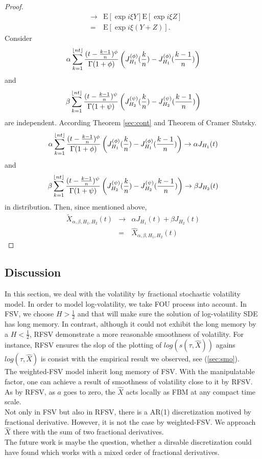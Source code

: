 \documentclass[a4paper, twoside, 11pt]{article}
\theoremstyle{definition}
\DeclarePairedDelimiter\floor{\lfloor}{\rfloor}
\newcommand{\brkt}[1]{\left({#1} \right)}
\begin{document}
\begin{proof}
\begin{eqnarray*}
  &\rightarrow& \mathrm{E}[\exp{i\xi Y}] \mathrm{E}[\exp{i\xi Z}]\\
  &=& \mathrm{E}[\exp{i\xi (Y+Z)}].
\end{eqnarray*}
Consider 
$$
\alpha\sum_{k=1}^{\floor{nt}} \frac{(t - \frac{k-1}{n})^\phi}{\Gamma(1+\phi)} \brkt{J_{H_1}^{(\phi)}(\frac{k}{n}) - J_{H_1}^{(\phi)}(\frac{k-1}{n})}$$
and 
$$\beta\sum_{k=1}^{\floor{nt}} \frac{(t - \frac{k-1}{n})^\psi}{\Gamma(1+\psi)} \brkt{J_{H_2}^{(\psi)}(\frac{k}{n}) - J_{H_2}^{(\psi)}(\frac{k-1}{n})}
$$
are independent. According Theorem \ref{sec:cont} and Theorem of Cramer Slutsky. 
$$
\alpha\sum_{k=1}^{\floor{nt}} \frac{(t - \frac{k-1}{n})^\phi}{\Gamma(1+\phi)} \brkt{J_{H_1}^{(\phi)}(\frac{k}{n}) - J_{H_1}^{(\phi)}(\frac{k-1}{n})} \rightarrow \alpha J_{H_1}(t)
$$ and
$$
\beta\sum_{k=1}^{\floor{nt}} \frac{(t - \frac{k-1}{n})^\psi}{\Gamma(1+\psi)} \brkt{J_{H_2}^{(\psi)}(\frac{k}{n}) - J_{H_2}^{(\psi)}(\frac{k-1}{n})} \rightarrow \beta J_{H_2}(t)
$$ in distribution.
Then, since mentioned above,
\begin{eqnarray*}
  \tilde{X}_{\alpha,\beta,H_1,H_2}(t) &\rightarrow& \alpha J_{H_1}(t) + \beta J_{H_2}(t)\\
  &=& \hat{X}_{\alpha,\beta,H_1,H_2}(t)
\end{eqnarray*}
	\end{proof}
	\subsection{Discussion}
	In this section, we deal with the volatility by fractional stochastic volatility model. In order to model log-volatility, we take FOU process into account. In FSV, we choose $H > \frac{1}{2}$ and that will make sure the solution of log-volatility SDE has long memory. In contrast, although it could not exhibit the long memory by a $H < \frac{1}{2}$, RFSV demonstrate a more reasonable smoothness of volatility. For instance, RFSV ensures  the slop of the plotting of $log(s(\tau, \hat{X}))$ agains $log(\tau, \hat{X})$ is consist with the empirical result we observed, see (\ref{sec:smo}).\\
	The weighted-FSV model inherit long memory of FSV. With the manipulatable factor, one can achieve a result of smoothness of volatility close to it by RFSV. As by RFSV, as $a$ goes to zero, the $\hat{X}$ acts locally as FBM at any compact time scale.\\
	Not only  in FSV but also in RFSV, there is a AR(1)  discretization motived by fractional derivative. However, it is not the case by weighted-FSV. We approach $\hat{X}$  there with the sum of two fractional derivatives.
	\\
	The future work is maybe the question, whether a dirsable discretization could have found which works with a mixed order of fractional derivatives.
\end{document}

